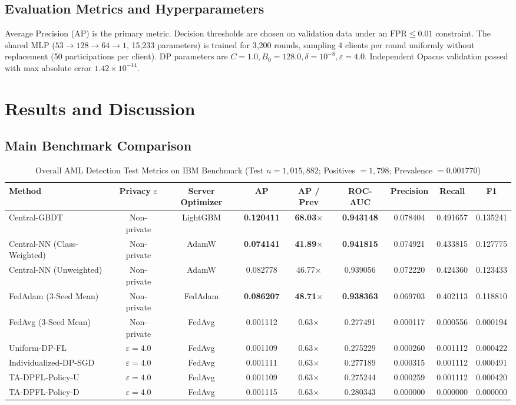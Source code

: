 \documentclass[conference]{IEEEtran}
\begin{document}
\subsection{Evaluation Metrics and Hyperparameters}
Average Precision (AP) is the primary metric. Decision thresholds are chosen on validation data under an $\text{FPR} \le 0.01$ constraint. The shared MLP ($53 \to 128 \to 64 \to 1$, 15,233 parameters) is trained for 3,200 rounds, sampling 4 clients per round uniformly without replacement (50 participations per client). DP parameters are $C = 1.0, B_0 = 128.0, \delta = 10^{-8}, \varepsilon = 4.0$. Independent Opacus validation passed with max absolute error $1.42 \times 10^{-14}$.

\section{Results and Discussion}
\subsection{Main Benchmark Comparison}

\begin{table}[t]
\centering
\caption{Overall AML Detection Test Metrics on IBM Benchmark (Test $n = 1,015,882$; Positives $= 1,798$; Prevalence $= 0.001770$)}
\label{tab:main_results}
\begin{tabular}{lcccccccc}
\toprule
\textbf{Method} & \textbf{Privacy $\varepsilon$} & \textbf{Server Optimizer} & \textbf{AP} & \textbf{AP / Prev} & \textbf{ROC-AUC} & \textbf{Precision} & \textbf{Recall} & \textbf{F1} \\
\midrule
Central-GBDT & Non-private & LightGBM & \textbf{0.120411} & \textbf{68.03$\times$} & \textbf{0.943148} & 0.078404 & 0.491657 & 0.135241 \\
Central-NN (Class-Weighted) & Non-private & AdamW & \textbf{0.074141} & \textbf{41.89$\times$} & \textbf{0.941815} & 0.074921 & 0.433815 & 0.127775 \\
Central-NN (Unweighted) & Non-private & AdamW & 0.082778 & 46.77$\times$ & 0.939056 & 0.072220 & 0.424360 & 0.123433 \\
FedAdam (3-Seed Mean) & Non-private & FedAdam & \textbf{0.086207} & \textbf{48.71$\times$} & \textbf{0.938363} & 0.069703 & 0.402113 & 0.118810 \\
FedAvg (3-Seed Mean) & Non-private & FedAvg & 0.001112 & 0.63$\times$ & 0.277491 & 0.000117 & 0.000556 & 0.000194 \\
\midrule
Uniform-DP-FL & $\varepsilon = 4.0$ & FedAvg & 0.001109 & 0.63$\times$ & 0.275229 & 0.000260 & 0.001112 & 0.000422 \\
Individualized-DP-SGD & $\varepsilon = 4.0$ & FedAvg & 0.001111 & 0.63$\times$ & 0.277189 & 0.000315 & 0.001112 & 0.000491 \\
TA-DPFL-Policy-U & $\varepsilon = 4.0$ & FedAvg & 0.001109 & 0.63$\times$ & 0.275244 & 0.000259 & 0.001112 & 0.000420 \\
TA-DPFL-Policy-D & $\varepsilon = 4.0$ & FedAvg & 0.001115 & 0.63$\times$ & 0.280343 & 0.000000 & 0.000000 & 0.000000 \\
\bottomrule
\end{tabular}
\end{table}
\end{document}
